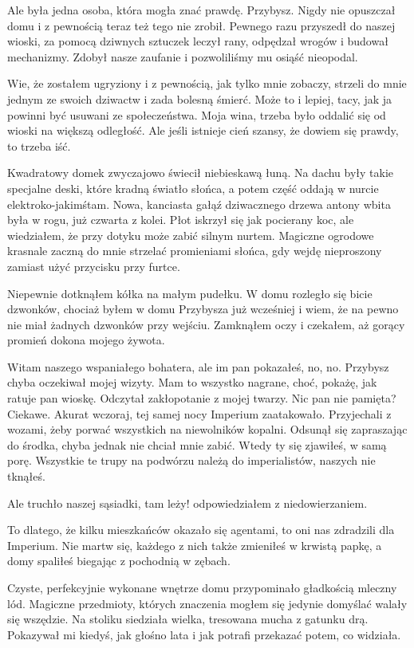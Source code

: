 Ale była jedna osoba, która mogła znać prawdę.
Przybysz. Nigdy nie opuszczał domu i z pewnością teraz też tego nie zrobił.
Pewnego razu przyszedł do naszej wioski, za pomocą dziwnych sztuczek leczył rany, odpędzał wrogów i budował mechanizmy.
Zdobył nasze zaufanie i pozwoliliśmy mu osiąść nieopodal.

Wie, że zostałem ugryziony i z pewnością, jak tylko mnie zobaczy, strzeli do mnie jednym ze swoich dziwactw i zada bolesną śmierć.
Może to i lepiej, tacy, jak ja powinni być usuwani ze społeczeństwa. Moja wina, trzeba było oddalić się od wioski na większą odległość.
Ale jeśli istnieje cień szansy, że dowiem się prawdy, to trzeba iść.

\divider{}
Kwadratowy domek zwyczajowo świecił niebieskawą łuną.
Na dachu były takie specjalne deski, które kradną światło słońca, a potem część oddają w nurcie elektroko-jakimśtam.
Nowa, kanciasta gałąź dziwacznego drzewa antony wbita była w rogu, już czwarta z kolei.
Płot iskrzył się jak pocierany koc, ale wiedziałem, że przy dotyku może zabić silnym nurtem.
Magiczne ogrodowe krasnale zaczną do mnie strzelać promieniami słońca, gdy wejdę nieproszony zamiast użyć przycisku przy furtce.

Niepewnie dotknąłem kółka na małym pudełku. 
W domu rozległo się bicie dzwonków, chociaż byłem w domu Przybysza już wcześniej i wiem, że na pewno nie miał żadnych dzwonków przy wejściu.
Zamknąłem oczy i czekałem, aż gorący promień dokona mojego żywota.

\ds{} Witam naszego wspaniałego bohatera, ale im pan pokazałeś, no, no. 
\dm{} Przybysz chyba oczekiwał mojej wizyty. \dm{} Mam to wszystko nagrane, choć, pokażę, jak ratuje pan wioskę.
\dm{} Odczytał zakłopotanie z mojej twarzy.
\dm{} Nic pan nie pamięta? Ciekawe. Akurat wczoraj, tej samej nocy Imperium zaatakowało.
Przyjechali z wozami, żeby porwać wszystkich na niewolników kopalni.
\dm{} Odsunął się zapraszając do środka, chyba jednak nie chciał mnie zabić.
\dm{} Wtedy ty się zjawiłeś, w samą porę. Wszystkie te trupy na podwórzu należą do imperialistów, naszych nie tknąłeś. \de{}

\ds{} Ale truchło naszej sąsiadki, tam leży! \dm{} odpowiedziałem z niedowierzaniem. \de{}

\ds{} To dlatego, że kilku mieszkańców okazało się agentami, to oni nas zdradzili dla Imperium. 
Nie martw się, każdego z nich także zmieniłeś w krwistą papkę, a domy spaliłeś biegając z pochodnią w zębach.\de{}

Czyste, perfekcyjnie wykonane wnętrze domu przypominało gładkością mleczny lód.
Magiczne przedmioty, których znaczenia mogłem się jedynie domyślać walały się wszędzie.
Na stoliku siedziała wielka, tresowana mucha z gatunku drą. Pokazywał mi kiedyś, jak głośno lata i jak potrafi przekazać potem, co widziała.

